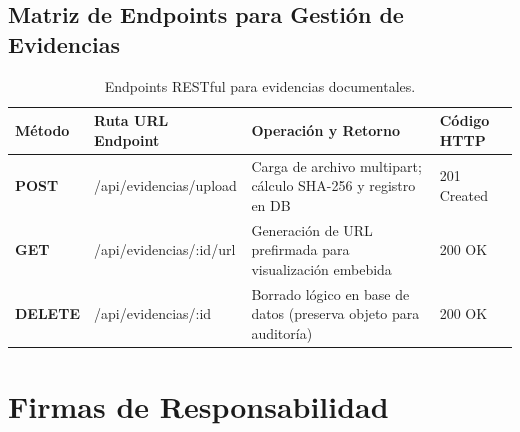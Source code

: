 \documentclass[12pt,a4paper]{article}
\begin{document}
\subsection{Matriz de Endpoints para Gestión de Evidencias}
\begin{table}[H]
\centering
\small
\renewcommand{\arraystretch}{1.2}
\begin{tabularx}{\textwidth}{|>{\hsize=0.45\hsize\centering\arraybackslash\bfseries\footnotesize}X|>{\hsize=1.25\hsize\raggedright\arraybackslash\footnotesize}X|>{\hsize=1.7\hsize\raggedright\arraybackslash\footnotesize}X|>{\hsize=0.6\hsize\centering\arraybackslash\footnotesize}X|}
\hline
\rowcolor{tableheader}
\textbf{Método} & \textbf{Ruta URL Endpoint} & \textbf{Operación y Retorno} & \textbf{Código HTTP} \\
\hline
POST & /api/evidencias/upload & Carga de archivo multipart; cálculo SHA-256 y registro en DB & 201 Created \\
\hline
GET & /api/evidencias/:id/url & Generación de URL prefirmada para visualización embebida & 200 OK \\
\hline
DELETE & /api/evidencias/:id & Borrado lógico en base de datos (preserva objeto para auditoría) & 200 OK \\
\hline
\end{tabularx}
\caption{Endpoints RESTful para evidencias documentales.}
\end{table}

\section{Firmas de Responsabilidad}
\end{document}
